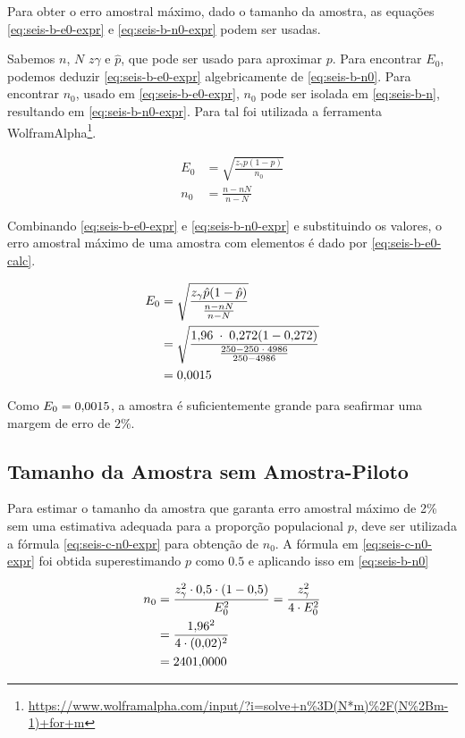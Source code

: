 	Para obter o erro amostral máximo, dado o tamanho da amostra, as equações
	\eqref{eq:seis-b-e0-expr} e \eqref{eq:seis-b-n0-expr} podem ser usadas. 

	Sabemos $n$, $N$ $z\gamma$ e $\hat{p}$, que pode ser usado para aproximar
	$p$. Para encontrar $E_0$, podemos deduzir \eqref{eq:seis-b-e0-expr}
	algebricamente de \eqref{eq:seis-b-n0}. Para encontrar $n_0$, usado em
	\eqref{eq:seis-b-e0-expr}, $n_0$ pode ser isolada em
	\eqref{eq:seis-b-n}, resultando em \eqref{eq:seis-b-n0-expr}. Para tal
	foi utilizada a ferramenta
	WolframAlpha\footnote{\url{https://www.wolframalpha.com/input/?i=solve+n\%3D(N*m)\%2F(N\%2Bm-1)+for+m}}.

	\begin{align}
		E_0 &= \label{eq:seis-b-e0-expr}
			   \sqrt{\frac{z_\gamma p(1 - p) }{n_0}} \\
		n_0 &= \label{eq:seis-b-n0-expr}
			   \frac{n-n N}{n-N}
	\end{align}

	Combinando \eqref{eq:seis-b-e0-expr} e \eqref{eq:seis-b-n0-expr} e
	substituindo os valores, o erro amostral máximo de uma amostra com
	\SEISn elementos é dado por \eqref{eq:seis-b-e0-calc}.

	\begin{align}
		\label{eq:seis-b-e0-calc}
		E_0 &= \sqrt{\frac{z_\gamma \hat{p}(1 - \hat{p}) }{\frac{n-n N}{n - N}}} \\
			&= \sqrt{\frac{\num{1.96} \;\cdot\; \num{0.272} (1 - \num{0.272}) }{\frac{250 - 250 \;\cdot\; 4986}{250 - 4986}}} \nonumber \\
			&= \num{0.0015} \nonumber
	\end{align}

	Como $E_0 = \num{0.0015}$, a amostra é suficientemente grande para seafirmar
	uma margem de erro de $2\%$.

\subsection{Tamanho da Amostra sem Amostra-Piloto}

	Para estimar o tamanho da amostra que garanta erro amostral máximo de 2\%
	sem uma estimativa adequada para a proporção populacional $p$, deve ser
	utilizada a fórmula \eqref{eq:seis-c-n0-expr} para obtenção de $n_0$. A
	fórmula em \eqref{eq:seis-c-n0-expr} foi obtida superestimando $p$ como
	$\num{0.5}$ e aplicando isso em \eqref{eq:seis-b-n0}

	\begin{align}
		n_0 &= \label{eq:seis-c-n0-expr}
			   \frac{z_\gamma^2 \cdot \num{0.5} \cdot (1 - \num{0.5})}{E_0^2} = \frac{z_\gamma^2}{4 \cdot E_0^2} \\
			&= \frac{\num{1.96}^2}{4 \cdot (\num{0.02})^2} \nonumber \\
			&= \label{eq:seis-c-n0-result}
			   \num{2401.0000}
	\end{align}

